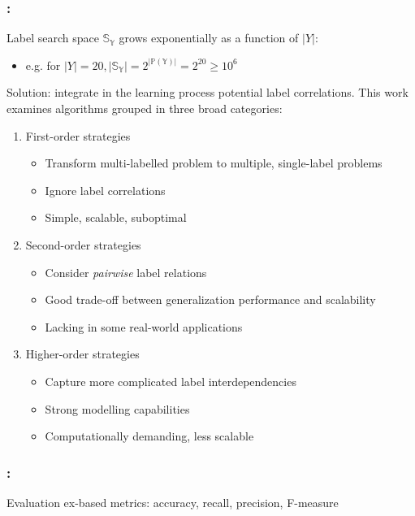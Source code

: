 \documentclass{beamer}
\begin{document}
\begin{frame}
\frametitle{\insertsection : \insertsubsection}
Label search space $\mathbb{S_Y}$ grows exponentially as a function of $|Y|$: 
\begin{itemize}
	\item e.g. for $|Y|=20, |\mathbb{S_Y}| = 2 ^ {|\mathbb{P(Y)}|} = 2^{20} \ge 10^6$
\end{itemize}
Solution: integrate in the learning process potential label correlations.
This work examines algorithms grouped in three broad categories:

\begin{enumerate}
	\item First-order strategies
		\begin{itemize}
			\item Transform multi-labelled problem to multiple, single-label problems 
			\item Ignore label correlations 
			\item Simple, scalable, suboptimal
		\end{itemize}
	\item Second-order strategies
		\begin{itemize}
			\item Consider \emph{pairwise} label relations
			\item Good trade-off between generalization performance and scalability
			\item Lacking in some real-world applications
		\end{itemize} 
	\item Higher-order strategies
		\begin{itemize}
			\item Capture more complicated label interdependencies
			\item Strong modelling capabilities
			\item Computationally demanding, less scalable
		\end{itemize}

\end{enumerate}
\end{frame}

\begin{frame}
\frametitle{\insertsection : \insertsubsection}
Evaluation ex-based metrics: accuracy, recall, precision, F-measure
\end{frame}
\end{document}
